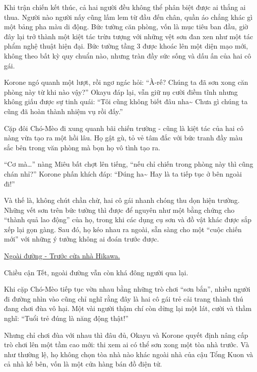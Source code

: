 \documentclass[../main.tex]{subfiles}
\begin{document}
Khi trận chiến kết thúc, cả hai người đều không thể phân biệt được ai thắng ai thua. Người nào người nấy cũng lấm lem từ đầu đến chân, quần áo chẳng khác gì một bảng pha màu di động. Bức tường căn phòng, vốn là mục tiêu ban đầu, giờ đây lại trở thành một kiệt tác trừu tượng với những vệt sơn đan xen như một tác phẩm nghệ thuật hiện đại. Bức tường tầng 3 được khoác lên một diện mạo mới, không theo bất kỳ quy chuẩn nào, nhưng tràn đầy sức sống và dấu ấn của hai cô gái.

Korone ngó quanh một lượt, rồi ngơ ngác hỏi: ``À-rế? Chúng ta đã sơn xong căn phòng này từ khi nào vậy?'' Okayu đáp lại, vẫn giữ nụ cười điềm tĩnh nhưng không giấu được sự tinh quái: ``Tôi cũng không biết đâu nha\~{} Chưa gì chúng ta cũng đã hoàn thành nhiệm vụ rồi đấy.''

Cặp đôi Chó-Mèo đi xung quanh bãi chiến trường - cũng là kiệt tác của hai cô nàng vừa tạo ra một hồi lâu. Họ gật gù, tỏ vẻ tâm đắc với bức tranh đầy màu sắc bên trong văn phòng mà bọn họ vô tình tạo ra.

``Cơ mà\dots'' nàng Miêu bất chợt lên tiếng, ``nếu chỉ chiến trong phòng này thì cũng chán nhỉ?'' Korone phấn khích đáp: ``Đúng ha\~{} Hay là ta tiếp tục ở bên ngoài đi!''

Và thế là, không chút chần chừ, hai cô gái nhanh chóng thu dọn hiện trường. Những vết sơn trên bức tường thì được để nguyên như một bằng chứng cho ``thành quả lao động'' của họ, trong khi các dụng cụ sơn và đồ vật khác được sắp xếp lại gọn gàng. Sau đó, họ kéo nhau ra ngoài, sẵn sàng cho một ``cuộc chiến mới'' với những ý tưởng không ai đoán trước được.

\begin{center}
    \uline{Ngoài đường - Trước cửa nhà Hikawa.}
\end{center}

Chiều cận Tết, ngoài đường vẫn còn khá đông người qua lại.

Khi cặp Chó-Mèo tiếp tục vờn nhau bằng những trò chơi ``sơn bắn'', nhiều người đi đường nhìn vào cũng chỉ nghĩ rằng đây là hai cô gái trẻ cải trang thành thú đang chơi đùa vô hại. Một vài người thậm chí còn dừng lại một lát, cười và thầm nghĩ: ``Tuổi trẻ đúng là năng động thật!''

Nhưng chỉ chơi đùa với nhau thì đâu đủ, Okayu và Korone quyết định nâng cấp trò chơi lên một tầm cao mới: thi xem ai có thể sơn xong một tòa nhà trước. Và như thường lệ, họ không chọn tòa nhà nào khác ngoài nhà của cậu Tổng Kuon và cả nhà kế bên, vốn là một cửa hàng bán đồ điện tử.
\end{document}
